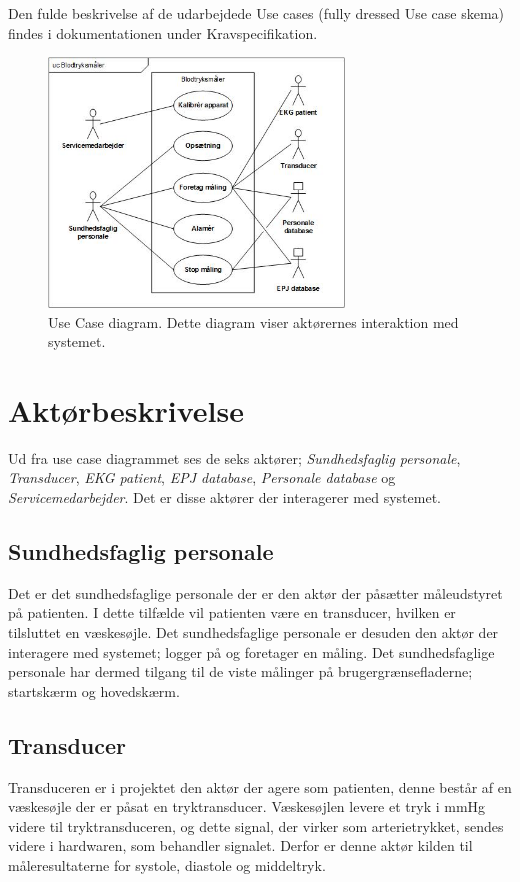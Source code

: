 Den fulde beskrivelse af de udarbejdede Use cases (fully dressed Use case skema) findes i dokumentationen under Kravspecifikation.
\begin{figure}[H]
\includegraphics[width =0.7\textwidth , center]{billeder/UseCaseDiagram}
\caption{Use Case diagram. Dette diagram viser aktørernes interaktion med systemet.}
\end{figure}
\section{Aktørbeskrivelse}
Ud fra use case diagrammet ses de seks aktører; \textit{Sundhedsfaglig personale}, \textit{Transducer}, \textit{EKG patient}, \textit{EPJ database}, \textit{Personale database} og \textit{Servicemedarbejder}. Det er disse aktører der interagerer med systemet.
\subsection{Sundhedsfaglig personale}
Det er det sundhedsfaglige personale der er den aktør der påsætter måleudstyret på patienten. I dette tilfælde vil patienten være en transducer, hvilken er tilsluttet en væskesøjle. Det sundhedsfaglige personale er desuden den aktør der interagere med systemet; logger på og foretager en måling. Det sundhedsfaglige personale har dermed tilgang til de viste målinger på brugergrænsefladerne; startskærm og hovedskærm.
\subsection{Transducer}
Transduceren er i projektet den aktør der agere som patienten, denne består af en væskesøjle der er påsat en tryktransducer. Væskesøjlen levere et tryk i mmHg videre til tryktransduceren, og dette signal, der virker som arterietrykket, sendes videre i hardwaren, som behandler signalet. Derfor er denne aktør kilden til måleresultaterne for systole, diastole og middeltryk. 
